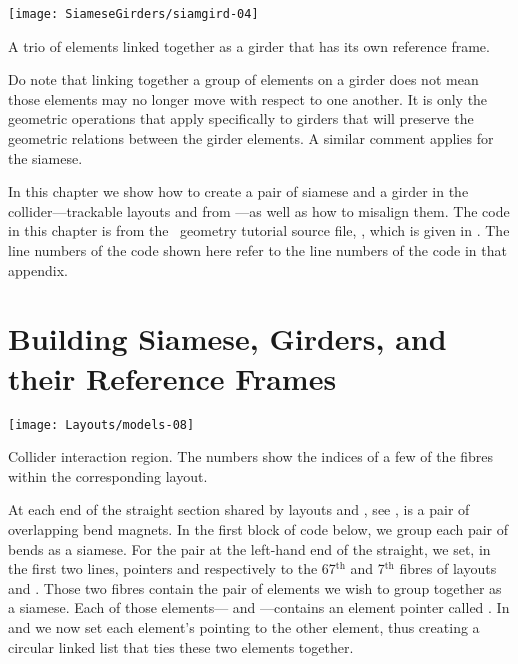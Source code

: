 \begin{marginfigure}[-21\baselineskip]\forceversofloat
  \texttt{[image: SiameseGirders/siamgird-04]}
  \caption{A trio of elements linked together as a girder that
           has its own reference frame.}
  \label{fig:ll.girder}
\end{marginfigure}

Do note that linking together a group of elements on a girder does not mean those elements may no longer move with respect to one another. It is only the geometric operations that apply specifically to girders that will preserve the geometric relations between the girder elements. A similar comment applies for the siamese.

%
In this chapter we show how to create a pair of siamese and a girder
in the collider---trackable layouts  and  from
---as well as how to misalign them. The code in
this chapter is from the \PTC\ geometry tutorial source file,
, which is given in .
The line numbers of the code shown here refer to the line numbers
of the code in that appendix.


\section{Building Siamese, Girders, and their Reference Frames}

\begin{marginfigure}[2\baselineskip]\forceversofloat
  \texttt{[image: Layouts/models-08]}
  \caption{Collider interaction region. The numbers show the indices
           of a few of the fibres within the corresponding layout.}
  \label{fig:col.intxn}
\end{marginfigure}

%
At each end of the straight section shared by layouts 
and , see , is a pair of overlapping bend
magnets. In the first block of code below, we group each pair of bends
as a siamese. For the pair at the left-hand end of the straight,
we set, in the first two lines, pointers  and 
respectively to the 67$^\text{th}$ and 7$^\text{th}$ fibres of
layouts  and . Those two fibres contain the
pair of elements we wish to group together as a siamese. Each of
those elements--- and ---contains an
element pointer called . In  and
 we now set each element's  pointing
to the other element, thus creating a circular linked list that
ties these two elements together.

